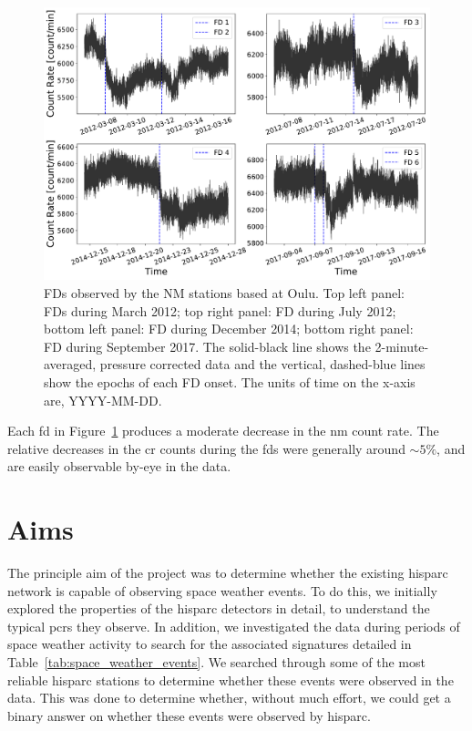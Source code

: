 \begin{figure}[ht!]
	\centering
	\includegraphics[width=0.75\columnwidth]{FDs_OULU.pdf}
	\caption{FDs observed by the NM stations based at Oulu. Top left panel: FDs during March 2012; top right panel: FD during July 2012; bottom left panel: FD during December 2014; bottom right panel: FD during September 2017. The solid-black line shows the 2-minute-averaged, pressure corrected data and the vertical, dashed-blue lines show the epochs of each FD onset. The units of time on the x-axis are, YYYY-MM-DD.}
	\label{fig:oulu_fds}
\end{figure}


Each \gls{fd} in Figure~\ref{fig:oulu_fds} produces a moderate decrease in the \gls{nm} count rate. The relative decreases in the \gls{cr} counts during the \glspl{fd} were generally around $\sim 5\%$, and are easily observable by-eye in the data.





\section{Aims}\label{sec:HS_aims}


The principle aim of the project was to determine whether the existing \gls{hisparc} network is capable of observing space weather events. To do this, we initially explored the properties of the \gls{hisparc} detectors in detail, to understand the typical \glspl{pcr} they observe. In addition, we investigated the data during periods of space weather activity to search for the associated signatures detailed in Table~\ref{tab:space_weather_events}. We searched through some of the most reliable \gls{hisparc} stations to determine whether these events were observed in the data. This was done to determine whether, without much effort, we could get a binary answer on whether these events were observed by \gls{hisparc}.

